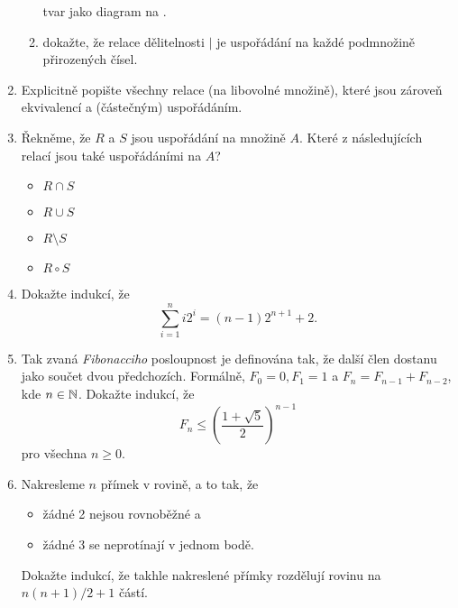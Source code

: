 \begin{enumerate}
\begin{enumerate}
    tvar jako diagram na .
   \item dokažte, že relace dělitelnosti $ \mid $ je uspořádání na každé
    podmnožině přirozených čísel.
  \end{enumerate}
 \item Explicitně popište všechny relace (na libovolné množině), které jsou
  zároveň ekvivalencí a (částečným) uspořádáním.
 \item Řekněme, že $R$ a $S$ jsou uspořádání na množině $A$. Které z
  následujících relací jsou také uspořádáními na $A$?
  \begin{itemize}[itemsep=0pt]
  \item $R \cap S$ 
  \item $R \cup S$ 
  \item $R \setminus S$
  \item $R \circ S$
 \end{itemize}
 \item Dokažte indukcí, že
  \[
   \sum_{i=1}^{n} i 2^{i} = (n - 1)2^{n+1} + 2.
  \]
 \item Tak zvaná \emph{Fibonacciho} posloupnost je definována tak, že další člen
  dostanu jako součet dvou předchozích. Formálně, $F_0 = 0, F_1 = 1$ a $F_n =
  F_{n - 1} + F_{n - 2}$, kde $n \in \mathbb{N}$. Dokažte indukcí, že
  \[
   F_n \leq \left( \frac{1+\sqrt{5}}{2} \right) ^{n-1}
  \]
  pro všechna $n \geq 0$.
 \item Nakresleme $n$ přímek v rovině, a to tak, že
  \begin{itemize}
   \item žádné 2 nejsou rovnoběžné a
   \item žádné 3 se neprotínají v jednom bodě.
  \end{itemize}
  Dokažte indukcí, že takhle nakreslené přímky rozdělují rovinu na $n(n+1) / 2 +
  1$ částí.
\end{enumerate}

